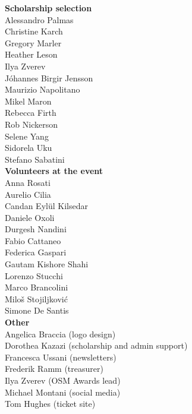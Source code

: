 \begin{multicols}{2}
\begin{small}
    \vspace{\volunteerSpace}
    \textbf{Scholarship selection}\\
    Alessandro Palmas\\
    Christine Karch\\
    Gregory Marler\\
    Heather Leson\\
    Ilya Zverev\\
    Jóhannes Birgir Jensson\\
    Maurizio Napolitano\\
    Mikel Maron\\
    Rebecca Firth\\
    Rob Nickerson\\
    Selene Yang\\
    Sidorela Uku\\
    Stefano Sabatini\\

    \vspace{\volunteerSpace}
    \textbf{Volunteers at the event}\\
    Anna Rosati\\
    Aurelio Cilia\\
    Candan Eylül Kilsedar\\
    Daniele Oxoli\\
    Durgesh Nandini\\
    Fabio Cattaneo\\
    Federica Gaspari\\
    Gautam Kishore Shahi\\
    Lorenzo Stucchi\\
    Marco Brancolini\\
    Miloš Stojiljković\\
    Simone De Santis\\

    \enlargethispage{1\baselineskip}
    \vspace{\volunteerSpace}
    \textbf{Other}\\
    Angelica Braccia (logo design)\\
    Dorothea Kazazi (scholarship and admin support)\\
    Francesca Ussani (newsletters)\\
    Frederik Ramm (treasurer)\\
    Ilya Zverev (OSM Awards lead)\\
    Michael Montani (social media)\\
    Tom Hughes (ticket site)\\
  \end{small}
\end{multicols}
\justifying

\newpage
\pagestyle{sponsor-microsoft}
\null
\newpage
\pagestyle{sponsor-facebook}
\null
\newpage
\pagestyle{sponsor-mapbox}
\null
\newpage
